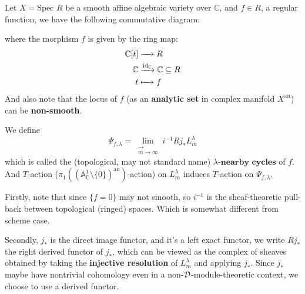\bigskip

Let $X = \text{Spec } R$ be a smooth affine algebraic variety over $\mathbb{C}$, and $f \in R$,
a regular function, we have the following commutative diagram:
\begin{center}\label{commutative_diagram_of_hyper_surface}
\end{center}
where the morphism $f$ is given by the ring map:
\begin{align*}
    \mathbb{C}[t] & \xrightarrow{\quad} R                       \\
    \mathbb{C}    & \xrightarrow{\mathrm{id}_{\mathbb{C}}} \mathbb{C} \subseteq R \\
    t     & \xmapsto{\quad} f
\end{align*}
And also note that the locus of $f$ (as an \textbf{analytic set} in complex manifold $X^\mathrm{an}$) can be \textbf{non-smooth}.

We define
$$
    \Psi_{f,\lambda} = \lim_{\substack{\longrightarrow \\ m \to \infty}} i^{-1} Rj_\ast L_m^{\lambda}
$$
which is called the (topological, may not standard name) $\lambda\textbf{-nearby cycles}$ of $f$.
And $T$-action ($\pi_1((\mathbb{A}_{\mathbb{C}}^1 \setminus \{0\})^\mathrm{an})$-action) on $L_m^{\lambda}$ induces $T$-action on $\Psi_{f,\lambda}$.



\begin{remark}
    Firstly, note that since $\{f=0\}$ may not smooth, so $i^{-1}$ is the sheaf-theoretic pull-back between topological (ringed) spaces.
    Which is somewhat different from scheme case.

    Secondly, $j_{\ast}$ is the direct image functor,
    and it's a left exact functor,
    we write $Rj_\ast$ the right derived functor of $j_{\ast}$,
    which can be viewed as the complex of sheaves obtained by taking the \textbf{injective resolution} of $L_{m}^{\lambda}$ and applying $j_{\ast}$.
    Since $j_\ast$ maybe have nontrivial cohomology even in a non-$\mathcal{D}$-module-theoretic context, we choose to use a derived functor.
\end{remark}

